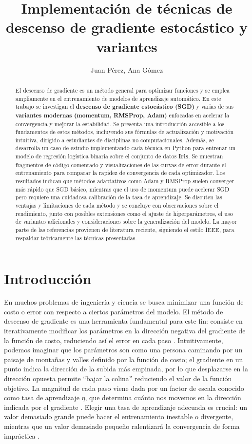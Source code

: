 \documentclass[12pt, spanish]{article}
\title{Implementación de técnicas de descenso de gradiente estocástico y variantes}
\author{Juan Pérez, Ana Gómez}
\date{}
\begin{document}
\maketitle

\begin{abstract}
El descenso de gradiente es un método general para optimizar funciones y se emplea ampliamente en el entrenamiento de modelos de aprendizaje automático. En este trabajo se investigan el \textbf{descenso de gradiente estocástico (SGD)} y varias de sus \textbf{variantes modernas (momentum, RMSProp, Adam)} enfocadas en acelerar la convergencia y mejorar la estabilidad. Se presenta una introducción accesible a los fundamentos de estos métodos, incluyendo sus fórmulas de actualización y motivación intuitiva, dirigido a estudiantes de disciplinas no computacionales. Además, se desarrolla un caso de estudio implementando cada técnica en Python para entrenar un modelo de regresión logística binaria sobre el conjunto de datos \textbf{Iris}. Se muestran fragmentos de código comentado y visualizaciones de las curvas de error durante el entrenamiento para comparar la rapidez de convergencia de cada optimizador. Los resultados indican que métodos adaptativos como Adam y RMSProp suelen converger más rápido que SGD básico, mientras que el uso de momentum puede acelerar SGD pero requiere una cuidadosa calibración de la tasa de aprendizaje. Se discuten las ventajas y limitaciones de cada método y se concluye con observaciones sobre el rendimiento, junto con posibles extensiones como el ajuste de hiperparámetros, el uso de variantes adicionales y consideraciones sobre la generalización del modelo. La mayor parte de las referencias provienen de literatura reciente, siguiendo el estilo IEEE, para respaldar teóricamente las técnicas presentadas.
\end{abstract}

\section{Introducción}
En muchos problemas de ingeniería y ciencia se busca minimizar una función de costo o error con respecto a ciertos parámetros del modelo. El método de descenso de gradiente es una herramienta fundamental para este fin: consiste en iterativamente modificar los parámetros en la dirección negativa del gradiente de la función de costo, reduciendo así el error en cada paso \cite{ref1,ref2}. Intuitivamente, podemos imaginar que los parámetros son como una persona caminando por un paisaje de montañas y valles definido por la función de costo; el gradiente en un punto indica la dirección de la subida más empinada, por lo que desplazarse en la dirección opuesta permite “bajar la colina” reduciendo el valor de la función objetivo. La magnitud de cada paso viene dada por un factor de escala conocido como tasa de aprendizaje $\eta$, que determina cuánto nos movemos en la dirección indicada por el gradiente \cite{ref3,ref4}. Elegir una tasa de aprendizaje adecuada es crucial: un valor demasiado grande puede hacer el entrenamiento inestable o divergente, mientras que un valor demasiado pequeño ralentizará la convergencia de forma impráctica \cite{ref4}.
\end{document}
